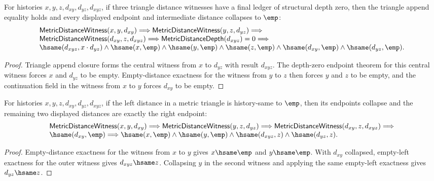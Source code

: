 \begin{theorem}
\label{thm:metric-distance-witness-triangle-depth-zero-collapse}
For histories $x,y,z,d_{xy},d_{yz},d_{xyz}$, if three triangle distance
witnesses have a final ledger of structural depth zero, then the triangle
append equality holds and every displayed endpoint and intermediate distance
collapses to $\emp$:
$$
\begin{array}{l}
\mathsf{MetricDistanceWitness}(x,y,d_{xy})\Longrightarrow
\mathsf{MetricDistanceWitness}(y,z,d_{yz})\Longrightarrow
\\
\mathsf{MetricDistanceWitness}(d_{xy},z,d_{xyz})\Longrightarrow
\mathsf{MetricDistanceDepth}(d_{xyz})=0\Longrightarrow
\\
\hsame(d_{xyz},x\cdot d_{yz})\land
\hsame(x,\emp)\land\hsame(y,\emp)\land\hsame(z,\emp)\land
\hsame(d_{xy},\emp)\land\hsame(d_{yz},\emp).
\end{array}
$$
\end{theorem}
\begin{proof}
Triangle append closure forms the central witness from $x$ to $d_{yz}$ with
result $d_{xyz}$. The depth-zero endpoint theorem for this central witness
forces $x$ and $d_{yz}$ to be empty. Empty-distance exactness for the witness
from $y$ to $z$ then forces $y$ and $z$ to be empty, and the continuation
field in the witness from $x$ to $y$ forces $d_{xy}$ to be empty.
\end{proof}

\begin{theorem}
\label{thm:metric-distance-witness-triangle-left-distance-empty-collapse}
For histories $x,y,z,d_{xy},d_{yz},d_{xyz}$, if the left distance in a
metric triangle is history-same to $\emp$, then its endpoints collapse and the
remaining two displayed distances are exactly the right endpoint:
$$
\begin{array}{l}
\mathsf{MetricDistanceWitness}(x,y,d_{xy})\Longrightarrow
\mathsf{MetricDistanceWitness}(y,z,d_{yz})\Longrightarrow
\mathsf{MetricDistanceWitness}(d_{xy},z,d_{xyz})\Longrightarrow\\
\hsame(d_{xy},\emp)\Longrightarrow
\hsame(x,\emp)\land\hsame(y,\emp)\land
\hsame(d_{xyz},z)\land\hsame(d_{yz},z).
\end{array}
$$
\end{theorem}
\begin{proof}
Empty-distance exactness for the witness from $x$ to $y$ gives
$x\hsame\emp$ and $y\hsame\emp$. With $d_{xy}$ collapsed, empty-left exactness
for the outer witness gives $d_{xyz}\hsame z$. Collapsing $y$ in the second
witness and applying the same empty-left exactness gives $d_{yz}\hsame z$.
\end{proof}

